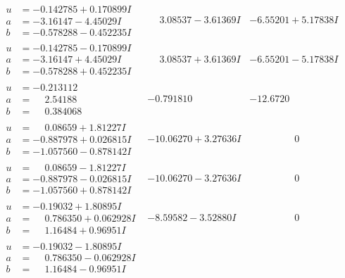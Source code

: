 \documentclass[1p]{elsarticle_modified}
\theoremstyle{definition}
\begin{document}
$$\begin{array}{c|c|c}
\begin{aligned}
u &= -0.142785 + 0.170899 I \\
a &= -3.16147 - 4.45029 I \\
b &= -0.578288 - 0.452235 I\end{aligned}
 & \phantom{-}3.08537 - 3.61369 I & -6.55201 + 5.17838 I \\ \hline\begin{aligned}
u &= -0.142785 - 0.170899 I \\
a &= -3.16147 + 4.45029 I \\
b &= -0.578288 + 0.452235 I\end{aligned}
 & \phantom{-}3.08537 + 3.61369 I & -6.55201 - 5.17838 I \\ \hline\begin{aligned}
u &= -0.213112\phantom{ +0.000000I} \\
a &= \phantom{-}2.54188\phantom{ +0.000000I} \\
b &= \phantom{-}0.384068\phantom{ +0.000000I}\end{aligned}
 & -0.791810\phantom{ +0.000000I} & -12.6720\phantom{ +0.000000I} \\ \hline\begin{aligned}
u &= \phantom{-}0.08659 + 1.81227 I \\
a &= -0.887978 + 0.026815 I \\
b &= -1.057560 - 0.878142 I\end{aligned}
 & -10.06270 + 3.27636 I & \phantom{-0.000000 } 0 \\ \hline\begin{aligned}
u &= \phantom{-}0.08659 - 1.81227 I \\
a &= -0.887978 - 0.026815 I \\
b &= -1.057560 + 0.878142 I\end{aligned}
 & -10.06270 - 3.27636 I & \phantom{-0.000000 } 0 \\ \hline\begin{aligned}
u &= -0.19032 + 1.80895 I \\
a &= \phantom{-}0.786350 + 0.062928 I \\
b &= \phantom{-}1.16484 + 0.96951 I\end{aligned}
 & -8.59582 - 3.52880 I & \phantom{-0.000000 } 0 \\ \hline\begin{aligned}
u &= -0.19032 - 1.80895 I \\
a &= \phantom{-}0.786350 - 0.062928 I \\
b &= \phantom{-}1.16484 - 0.96951 I\end{aligned}

\end{array}$$
\end{document}
